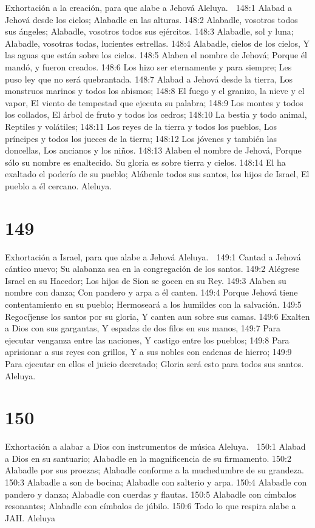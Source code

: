 Exhortación a la creación, para que alabe a Jehová 
Aleluya. 

148:1 Alabad a Jehová desde los cielos; 
Alabadle en las alturas. 
148:2 Alabadle, vosotros todos sus ángeles; 
Alabadle, vosotros todos sus ejércitos. 
148:3 Alabadle, sol y luna; 
Alabadle, vosotras todas, lucientes estrellas. 
148:4 Alabadle, cielos de los cielos, 
Y las aguas que están sobre los cielos. 
148:5 Alaben el nombre de Jehová; 
Porque él mandó, y fueron creados. 
148:6 Los hizo ser eternamente y para siempre; 
Les puso ley que no será quebrantada. 
148:7 Alabad a Jehová desde la tierra, 
Los monstruos marinos y todos los abismos; 
148:8 El fuego y el granizo, la nieve y el vapor, 
El viento de tempestad que ejecuta su palabra; 
148:9 Los montes y todos los collados, 
El árbol de fruto y todos los cedros; 
148:10 La bestia y todo animal, 
Reptiles y volátiles; 
148:11 Los reyes de la tierra y todos los pueblos, 
Los príncipes y todos los jueces de la tierra; 
148:12 Los jóvenes y también las doncellas, 
Los ancianos y los niños. 
148:13 Alaben el nombre de Jehová, 
Porque sólo su nombre es enaltecido. 
Su gloria es sobre tierra y cielos. 
148:14 El ha exaltado el poderío de su pueblo; 
Alábenle todos sus santos, los hijos de Israel, 
El pueblo a él cercano. 
Aleluya. 

\chapter{149}

Exhortación a Israel, para que alabe a Jehová 
Aleluya. 

149:1 Cantad a Jehová cántico nuevo; 
Su alabanza sea en la congregación de los santos. 
149:2 Alégrese Israel en su Hacedor; 
Los hijos de Sion se gocen en su Rey. 
149:3 Alaben su nombre con danza; 
Con pandero y arpa a él canten. 
149:4 Porque Jehová tiene contentamiento en su pueblo; 
Hermoseará a los humildes con la salvación. 
149:5 Regocíjense los santos por su gloria, 
Y canten aun sobre sus camas. 
149:6 Exalten a Dios con sus gargantas, 
Y espadas de dos filos en sus manos, 
149:7 Para ejecutar venganza entre las naciones, 
Y castigo entre los pueblos; 
149:8 Para aprisionar a sus reyes con grillos, 
Y a sus nobles con cadenas de hierro; 
149:9 Para ejecutar en ellos el juicio decretado; 
Gloria será esto para todos sus santos. 
Aleluya. 

\chapter{150}

Exhortación a alabar a Dios con instrumentos de música 
Aleluya. 

150:1 Alabad a Dios en su santuario; 
Alabadle en la magnificencia de su firmamento. 
150:2 Alabadle por sus proezas; 
Alabadle conforme a la muchedumbre de su grandeza. 
150:3 Alabadle a son de bocina; 
Alabadle con salterio y arpa. 
150:4 Alabadle con pandero y danza; 
Alabadle con cuerdas y flautas. 
150:5 Alabadle con címbalos resonantes; 
Alabadle con címbalos de júbilo. 
150:6 Todo lo que respira alabe a JAH. 
Aleluya


